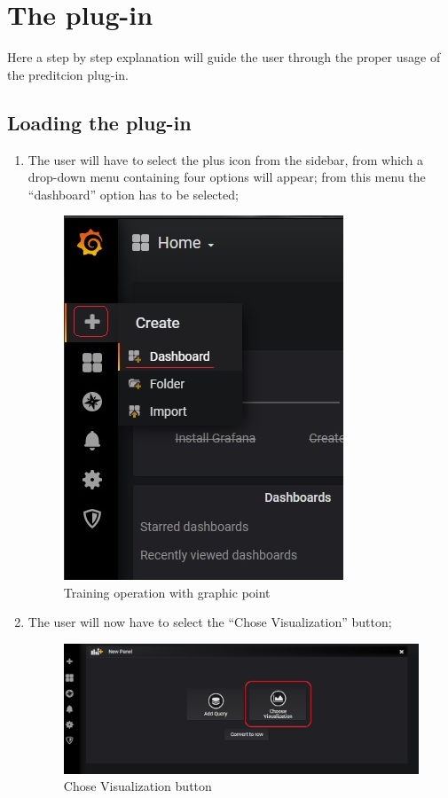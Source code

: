 \section{The plug-in}
Here a step by step explanation will guide the user through the proper usage of the preditcion plug-in.

\subsection{Loading the plug-in}
\begin{enumerate}
	\item The user will have to select the plus icon from the sidebar, from which a drop-down menu containing four options will appear; from this menu the “dashboard” option has to be selected;


\begin{figure}[H]
\centering
\includegraphics[scale=0.90]{img/plug-in/plus_dash.jpg}
\caption{Training operation with graphic point}
\end{figure}


	\item The user will now have to select the “Chose Visualization” button;


\begin{figure}[H]
\centering
\includegraphics[scale=0.65]{img/plug-in/visual.jpg}
\caption{Chose Visualization button}
\end{figure}



\end{enumerate}
